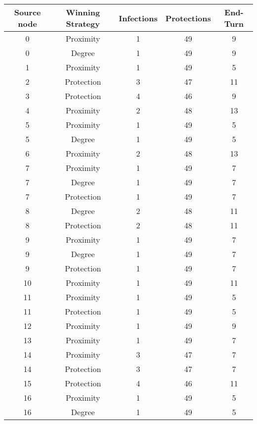 \documentclass[results.tex]{subfiles}
\begin{document}
\begin{center}
  \begin{tabular}{| c || c | c | c | c |}
    \hline
    {\bfseries Source node} & {\bfseries Winning Strategy} & {\bfseries Infections} & {\bfseries Protections} & {\bfseries End-Turn} \\  %
    \hline\hline
    0 & Proximity & 1 & 49 & 9 \\ 
    \hline
    0 & Degree & 1 & 49 & 9 \\ 
    \hline
    1 & Proximity & 1 & 49 & 5 \\ 
    \hline
    2 & Protection & 3 & 47 & 11 \\ 
    \hline
    3 & Protection & 4 & 46 & 9 \\ 
    \hline
    4 & Proximity & 2 & 48 & 13 \\ 
    \hline
    5 & Proximity & 1 & 49 & 5 \\ 
    \hline
    5 & Degree & 1 & 49 & 5 \\ 
    \hline
    6 & Proximity & 2 & 48 & 13 \\ 
    \hline
    7 & Proximity & 1 & 49 & 7 \\ 
    \hline
    7 & Degree & 1 & 49 & 7 \\ 
    \hline
    7 & Protection & 1 & 49 & 7 \\ 
    \hline
    8 & Degree & 2 & 48 & 11 \\ 
    \hline
    8 & Protection & 2 & 48 & 11 \\ 
    \hline
    9 & Proximity & 1 & 49 & 7 \\ 
    \hline
    9 & Degree & 1 & 49 & 7 \\ 
    \hline
    9 & Protection & 1 & 49 & 7 \\ 
    \hline
    10 & Proximity & 1 & 49 & 11 \\ 
    \hline
    11 & Proximity & 1 & 49 & 5 \\ 
    \hline
    11 & Protection & 1 & 49 & 5 \\ 
    \hline
    12 & Proximity & 1 & 49 & 9 \\ 
    \hline
    13 & Proximity & 1 & 49 & 7 \\ 
    \hline
    14 & Proximity & 3 & 47 & 7 \\ 
    \hline
    14 & Protection & 3 & 47 & 7 \\ 
    \hline
    15 & Protection & 4 & 46 & 11 \\ 
    \hline
    16 & Proximity & 1 & 49 & 5 \\ 
    \hline
    16 & Degree & 1 & 49 & 5 \\ 

\end{tabular}
\end{center}
\end{document}
